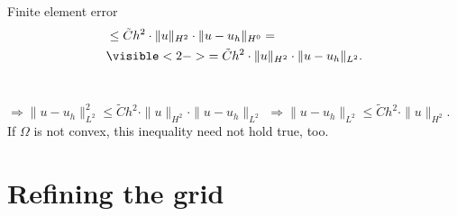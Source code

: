 \documentclass{beamer}
\begin{document}
\begin{frame}{Finite element error}
\begin{align*}
&\leq \tilde{C}h^2\cdot \|u\|_{H^2} \cdot \|u-u_h\|_{H^0} =\\
&\visible<2->{= \tilde{C}h^2\cdot \|u\|_{H^2}\cdot \|u-u_h\|_{L^2}.}
\end{align*}\\

\pause
\pause

\medskip
$\Rightarrow \|u-u_h\|_{L^2}^2 \leq \tilde{C}h^2\cdot \|u\|_{H^2}\cdot \|u-u_h\|_{L^2}$ \pause
$\Rightarrow \|u-u_h\|_{L^2} \leq \tilde{C}h^2 \cdot \|u\|_{H^2}$.\\[2.5ex]

\pause
If $\Omega$ is not convex, this inequality need not hold true, too.\\[0.9cm]
\end{frame}

\section{Refining the grid}
\end{document}
